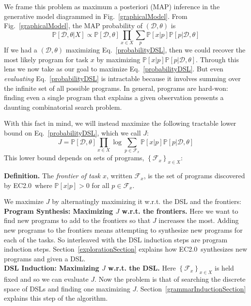 \documentclass{article}
\newcommand{\system}{EC2.0~}
\newcommand{\probability}{\mathds{P}} %
\begin{document}
We frame this problem as maximum a posteriori (MAP) inference in the generative model diagrammed in Fig.~\ref{graphicalModel}. From Fig.~\ref{graphicalModel}, the MAP probability of $(\mathcal{D},\theta)$ is
\begin{equation}
  \probability[\mathcal{D},\theta|X]\propto \probability[\mathcal{D},\theta] \prod_{x\in X} \sum_p \probability[x|p]\probability[p|\mathcal{D},\theta]\label{probabilityDSL}
\end{equation}
If we had a $(\mathcal{D},\theta)$ maximizing Eq.~\ref{probabilityDSL}, then we could recover the most likely program for task $x$ by maximizing $\probability[x|p] \probability[p|\mathcal{D},\theta]$.
Through this lens we now take as our goal to maximize Eq.~\ref{probabilityDSL}.
But even \emph{evaluating} Eq.~\ref{probabilityDSL} is intractable because it involves summing over the infinite set of all possible programs. In general, programs are hard-won: finding even a single program that explains a given observation presents a daunting combinatorial search problem.

With this fact in mind, we will instead maximize the following tractable lower bound on Eq.~\ref{probabilityDSL},
which we call $J$:
\begin{equation}
J = \probability[\mathcal{D},\theta]\prod_{x\in X}\log \sum_{p\in \mathcal{F}_x} \probability[x|p]\probability[p|\mathcal{D},\theta]\label{lowerBound}
\end{equation}
This lower bound depends on sets of programs, $\left\{\mathcal{F}_x \right\}_{x\in X}$:

\noindent\textbf{Definition.} The \emph{frontier of task $x$}, written $\mathcal{F}_x$,
is the set of programs discovered by \system where $\probability[x|p] > 0$ for all $p\in \mathcal{F}_x$.

We maximize $J$ by alternatingly maximizing it w.r.t. the DSL and the frontiers:
\\\noindent \textbf{Program Synthesis: Maximizing $J$ w.r.t. the frontiers.} Here we
want to find new programs to add to  the frontiers so that $J$ increases the most.
Adding new programs to the frontiers means attempting to synthesize new programs for each of the tasks.
So interleaved with the DSL induction steps are program induction steps. Section~\ref{explorationSection}
explains how \system synthesizes new programs and given a DSL.
\\\noindent \textbf{DSL Induction: Maximizing $J$ w.r.t. the DSL.} Here $\left\{\mathcal{F}_x \right\}_{x\in X}$ is held fixed and so we can evaluate $J$. Now the problem is that of searching the discrete space of DSLs and finding one maximizing $J$.  Section~\ref{grammarInductionSection} explains this step of the algorithm.
\end{document}

